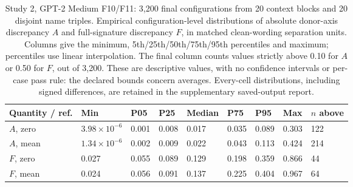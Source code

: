 \begin{table}[H]
\centering\footnotesize
\setlength{\tabcolsep}{3pt}
\caption{Study 2, GPT-2 Medium F10/F11: 3,200 final configurations from 20 context blocks and 20 disjoint name triples. Empirical configuration-level distributions of absolute donor-axis discrepancy $A$ and full-signature discrepancy $F$, in matched clean-wording separation units. Columns give the minimum, 5th/25th/50th/75th/95th percentiles and maximum; percentiles use linear interpolation. The final column counts values strictly above 0.10 for $A$ or 0.50 for $F$, out of 3,200. These are descriptive values, with no confidence intervals or per-case pass rule: the declared bounds concern averages. Every-cell distributions, including signed differences, are retained in the supplementary saved-output report.}
\label{tab:confirmation-distributions}
\begin{tabularx}{\linewidth}{@{}lYYYYYYYY@{}}
\toprule
Quantity / ref. & Min & P05 & P25 & Median & P75 & P95 & Max & $n$ above \\
\midrule
$A$, zero & $3.98\times10^{-6}$ & 0.001 & 0.008 & 0.017 & 0.035 & 0.089 & 0.303 & 122 \\
$A$, mean & $1.34\times10^{-6}$ & 0.002 & 0.009 & 0.022 & 0.043 & 0.113 & 0.424 & 214 \\
$F$, zero & 0.027 & 0.055 & 0.089 & 0.129 & 0.198 & 0.359 & 0.866 & 44 \\
$F$, mean & 0.024 & 0.056 & 0.091 & 0.137 & 0.225 & 0.404 & 0.967 & 64 \\
\bottomrule
\end{tabularx}
\end{table}
